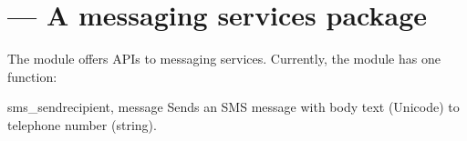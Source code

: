 %
%
%

\section{ --- 
    A messaging services package}
\label{sec:messaging}


The  module offers APIs to messaging services. Currently, 
the  module has one function:

\begin{funcdesc}{sms_send}{recipient, message}
Sends an SMS message with body text  (Unicode) to 
telephone number  (string).
\end{funcdesc}
